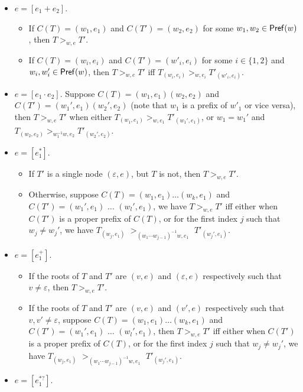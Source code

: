 \begin{definition}
\begin{itemize}
  		\item $e = [e_1 + e_2]$.
  		\begin{itemize}
  			\item If $C (T) = (w_1, e_1)$ and $C (T') = (w_2, e_2)$ for some $w_1, w_2 \in \mathsf{Pref}(w)$, then $T >_{w,e} T'$.
%  			
  			\item If $C (T) = (w_i, e_i)$ and $C (T') = (w'_i, e_i)$ for some $i \in \{ 1,
  			2 \}$ and $w_i, w'_i \in \mathsf{Pref}(w)$, then $T >_{w,e} T'$ iff $T_{(w_i, e_i)} >_{w, e_i} T'_{(w'_i, e_i)}$.
  		\end{itemize}
  		\item $e = [e_1 \cdot e_2]$. Suppose $C (T) = (w_1, e_1) (w_2, e_2)$ and $C (T') =
  		(w_1', e_1) (w_2', e_2)$ (note that $w_1$ is a prefix of $w'_1$ or vice versa), then $T >_{w,e} T'$ when either $T_{(w_1, e_1)} >_{w, e_1}
  		T'_{(w_1', e_1)}$, or $w_1 = w_1'$ and $T_{(w_2, e_2)} >_{w_1^{-1}w, e_2} T'_{(w_2', e_2)}$. 
%  		
  		\item $e = [e_1^{\ast}]$. 
		\begin{itemize}
		\item If $T' $ is  a single node $(\varepsilon, e)$, but $T$ is not, then $T >_{w, e} T'$.
  		\item Otherwise, suppose $C(T) = (w_1, e_1) \ldots (w_k, e_1)$ and $C (T') =
  		(w_1', e_1)$ $\ldots$ $(w_l', e_1)$, we have $T >_{w,e} T'$ iff either when $C (T')$
  		is a proper prefix of $C (T)$, or for the first index $j$ such that $w_j
  		\neq w_j'$, we have $T_{(w_j, e_1)}$ $>_{(w_1\cdots w_{j-1})^{-1}w, e_1}$ $T'_{(w_j', e_1)}$.
		\end{itemize}
%
  		\item $e = [e_1^{+}]$. 
		\begin{itemize}
		\item If the roots of $T$ and $T' $ are  $(v, e)$ and $(\varepsilon, e)$ respectively such that $v \neq \varepsilon$, then $T >_{w, e} T'$.
  		\item If the roots of $T$ and $T' $ are $(v, e)$ and $(v', e)$ respectively such that $v, v' \neq \varepsilon$,  suppose $C(T) = (w_1, e_1) \ldots (w_k, e_1)$ and $C (T') =
  		(w_1', e_1)$ $\ldots$ $(w_l', e_1)$, then $T >_{w,e} T'$ iff either when $C(T')$
  		is a proper prefix of $C (T)$, or for the first index $j$ such that $w_j
  		\neq w_j'$, we have $T_{(w_j, e_1)}$ $>_{(w_1\cdots w_{j-1})^{-1}w, e_1}$ $T'_{(w_j', e_1)}$.
		\end{itemize}
%
  		\item $e = [e_1^{\ast?}]$. 
		\begin{itemize}

\end{itemize}
\end{itemize}
\end{definition}
